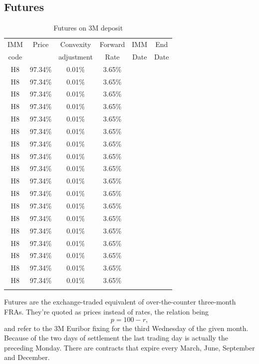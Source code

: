 \documentclass[11pt,reqno]{amsart}
\begin{document}
\subsection{\label{SecFutures}Futures}
\begin{table}[tbp]
\label{tab:Futures}
\begin{tabular}{cccccc}
IMM  & Price & Convexity  & Forward & IMM  & End  \\
code &       & adjustment & Rate    & Date & Date \\
H8 & 97.34\% & 0.01\% & 3.65\% &  &  \\
H8 & 97.34\% & 0.01\% & 3.65\% &  &  \\
H8 & 97.34\% & 0.01\% & 3.65\% &  &  \\
H8 & 97.34\% & 0.01\% & 3.65\% &  &  \\
H8 & 97.34\% & 0.01\% & 3.65\% &  &  \\
H8 & 97.34\% & 0.01\% & 3.65\% &  &  \\
H8 & 97.34\% & 0.01\% & 3.65\% &  &  \\
H8 & 97.34\% & 0.01\% & 3.65\% &  &  \\
H8 & 97.34\% & 0.01\% & 3.65\% &  &  \\
H8 & 97.34\% & 0.01\% & 3.65\% &  &  \\
H8 & 97.34\% & 0.01\% & 3.65\% &  &  \\
H8 & 97.34\% & 0.01\% & 3.65\% &  &  \\
H8 & 97.34\% & 0.01\% & 3.65\% &  &  \\
H8 & 97.34\% & 0.01\% & 3.65\% &  &  \\
H8 & 97.34\% & 0.01\% & 3.65\% &  &  \\
H8 & 97.34\% & 0.01\% & 3.65\% &  &  \\
H8 & 97.34\% & 0.01\% & 3.65\% &  &  \\
H8 & 97.34\% & 0.01\% & 3.65\% &  &  \\
&  &  &  &  &
\end{tabular}%
\caption{Futures on 3M deposit}
\end{table}

Futures are the exchange-traded equivalent of over-the-counter three-month FRAs.  They're quoted as prices instead of rates, the relation being
\begin{equation}
p = 100 - r,
\label{eqn:futurepricerate}
\end{equation}
and refer to the 3M Euribor fixing for the third Wednesday of the given month. Because of the two days of settlement the last trading day is actually the preceding Monday. There are contracts that expire every March, June, September and December.
\end{document}
